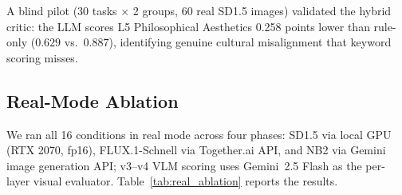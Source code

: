 \documentclass[sigconf, screen, review, anonymous]{acmart}
\newcommand{\Lx}[1]{L#1}
\begin{document}
A blind pilot (30 tasks $\times$ 2 groups, 60 real SD1.5 images) validated the hybrid critic: the LLM scores \Lx{5} Philosophical Aesthetics 0.258 points lower than rule-only ($0.629$ vs.\ $0.887$), identifying genuine cultural misalignment that keyword scoring misses.

\subsection{Real-Mode Ablation}
\label{sec:real_ablation}

We ran all 16 conditions in real mode across four phases: SD1.5 via local GPU (RTX 2070, fp16), FLUX.1-Schnell via Together.ai API, and NB2 via Gemini image generation API; v3--v4 VLM scoring uses Gemini~2.5 Flash as the per-layer visual evaluator.
Table~\ref{tab:real_ablation} reports the results.
\end{document}

